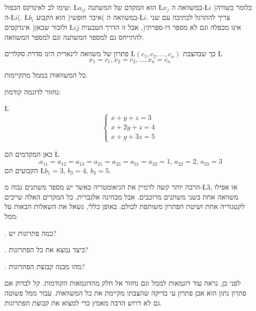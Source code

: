 שימו לב לאינדקס הכפול: \L{$a_{ij}$} הוא המקדם של המשתנה \L{$x_{j}$}
במשוואה ה-\L{$i$} )כלומר בשורה ה-\L{$i$}(. \L{$b_{i}$} הוא הקבוע
)איבר חופשי( במשוואה ה-\L{$i$}. צריך להתרגל לכתיבה עם שני אינדקסים
)ולזכור שכאן \L{$ij$} אינו מכפלה וגם לא מספר דו-ספרתי(, אבל זו הדרך
הטבעית להתייחס גם למספר המשתנה וגם למספר המשוואה.

\begin{hdef}
פתרון של משוואה לינארית הינו סדרת סקלרים \L{$(c_{1},c_{2},...,c_{n})$}
כך שבהצבת \L{%
\[
x_{1}=c_{1},x_{2}=c_{2},...,x_{n}=c_{n}
\]
}%

כל המשוואות בממ\textquotedbl ל מתקיימות.
\end{hdef}

\begin{example}
נחזור לדוגמה קודמת:

\L{%
\[
\begin{cases}
x+y+z=3\\
x+2y+z=4\\
x+y+3z=5
\end{cases}
\]
}%

כאן המקדמים הם \L{%
\[
.a_{11}=a_{12}=a_{13}=a_{21}=a_{23}=a_{31}=a_{32}=1,\,a_{22}=2,\,a_{33}=3
\]
}%
הקבועים הם \L{$b_{1}=3,\,b_{2}=4,\,b_{3}=5$}.
\end{example}

הרבה יותר קשה לדמיין את הגיאומטריה כאשר יש מספר משתנים גבוה מ-\L{$3$},
או אפילו משוואה אחת בשני משתנים מרוכבים. אבל מבחינה אלגברית, כל המקרים
האלה שייכים לקטגוריה אחת ושיטת הפתרון משותפת לכולם. באופן כללי, נשאל
את השאלות הבאות על ממ\textquotedbl ל:

{\endL}. כמה פתרונות יש?

{\endL}. כיצד נמצא את כל הפתרונות?

{\endL}. מהו מבנה קבוצת הפתרונות?

לפני כן, נראה עוד דוגמאות לממ\textquotedbl ל וגם נחזור אל חלק מהדוגמאות
הקודמות. קל לבדוק אם פתרון נתון הוא אכן פתרון ע\textquotedbl י בדיקה
שהצבתו מקיימת את כל המשוואות. עבור ממ\textquotedbl ל פשוטה גם לא
דרוש הרבה מאמץ כדי למצוא את קבוצת הפתרונות.

